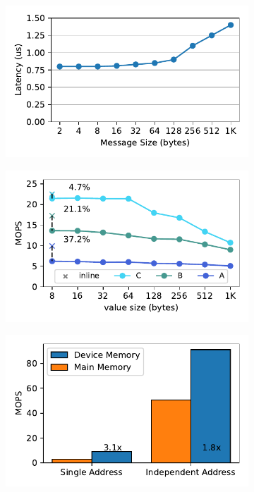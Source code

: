 \begin{figure}[t]
    \centering
    \newcommand{\subfigwidth}{0.32\linewidth}
    \begin{subfigure}{\subfigwidth}
        \includegraphics[width=0.99\linewidth]{fig/rdma_latency.pdf}
    \end{subfigure}
    \begin{subfigure}{\subfigwidth}
      \includegraphics[width=0.99\linewidth]{fig/extent.pdf}
    \end{subfigure}
    \begin{subfigure}{\subfigwidth}
        \includegraphics[width=0.99\linewidth]{fig/rdma_cas_throughput.pdf}

\end{subfigure}
\end{figure}
